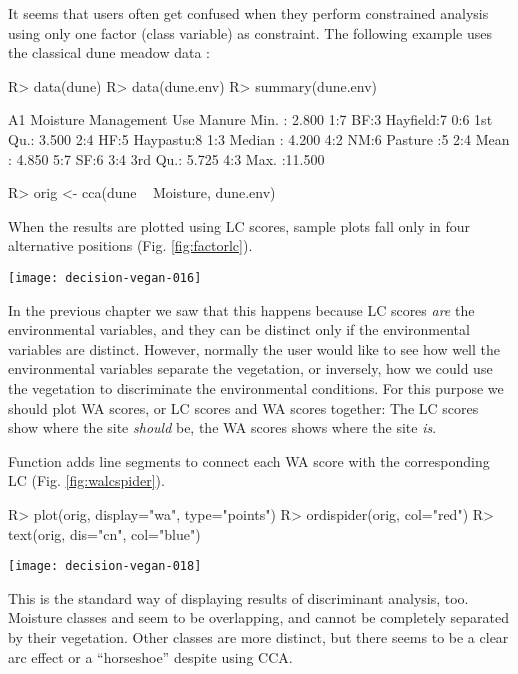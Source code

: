 \documentclass[article,nojss]{jss}
\renewcommand{\cite}{\citep}
\begin{document}
It seems that users often get confused when they perform constrained
analysis using  only one factor (class variable) as constraint.  The
following example uses the classical dune meadow data \cite{Jongman87}:
\begin{Schunk}
\begin{Sinput}
R> data(dune)
R> data(dune.env)
R> summary(dune.env)
\end{Sinput}
\begin{Soutput}
       A1         Moisture Management       Use    Manure
 Min.   : 2.800   1:7      BF:3       Hayfield:7   0:6   
 1st Qu.: 3.500   2:4      HF:5       Haypastu:8   1:3   
 Median : 4.200   4:2      NM:6       Pasture :5   2:4   
 Mean   : 4.850   5:7      SF:6                    3:4   
 3rd Qu.: 5.725                                    4:3   
 Max.   :11.500                                          
\end{Soutput}
\begin{Sinput}
R> orig <- cca(dune ~ Moisture, dune.env)
\end{Sinput}
\end{Schunk}
When the results are plotted using LC scores, sample plots fall only
in four alternative positions (Fig. \ref{fig:factorlc}).
\begin{SCfigure}
\texttt{[image: decision-vegan-016]}
\caption{LC scores of the dune meadow data using only one factor as a
  constraint.}
\label{fig:factorlc}
\end{SCfigure}
In the previous chapter we saw that this happens because LC scores
\emph{are} the environmental variables, and they can be distinct only
if the environmental variables are distinct.  However, normally the user
would like to see how well the environmental variables separate the
vegetation, or inversely, how we could use the vegetation to
discriminate the environmental conditions.  For this purpose we should
plot WA scores, or LC scores and WA scores together:  The LC scores
show where the site \emph{should} be, the WA scores shows where the
site \emph{is}.

Function  adds line segments to connect each WA
score with the corresponding LC (Fig.  \ref{fig:walcspider}).
\begin{Schunk}
\begin{Sinput}
R> plot(orig, display="wa", type="points")
R> ordispider(orig, col="red")
R> text(orig, dis="cn", col="blue")
\end{Sinput}
\end{Schunk}
\begin{SCfigure}
\texttt{[image: decision-vegan-018]}
\caption{A ``spider plot'' connecting WA scores to corresponding LC
  scores. The shorter the web segments, the better the ordination.}
\label{fig:walcspider}
\end{SCfigure}
This is the standard way of displaying results of discriminant
analysis, too.  Moisture classes  and  seem to be
overlapping, and cannot be completely separated by their
vegetation. Other classes are more distinct, but there seems to be a
clear arc effect or a ``horseshoe'' despite using CCA.
\end{document}
